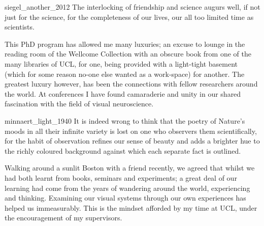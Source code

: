 \begin{acknowledgements}


\begin{citequote}{siegel_another_2012}
The interlocking of friendship and science augurs well, if not just for the science, for the completeness of our lives, our all too limited time as scientists.
\end{citequote}

This PhD program has allowed me many luxuries; an excuse to lounge in the reading room of the Wellcome Collection with an obscure book from one of the many libraries of \acrshort{UCL}, for one, being provided with a light-tight basement (which for some reason no-one else wanted as a work-space) for another.
The greatest luxury however, has been the connections with fellow researchers around the world. At conferences I have found camaraderie and unity in our shared fascination with the field of visual neuroscience. 
\bigskip

\begin{citequote}{minnaert_light_1940}
It is indeed wrong to think that the poetry of Nature's moods in all their infinite variety is lost on one who observers them scientifically, for the habit of observation refines our sense of beauty and adds a brighter hue to the richly coloured background against which each separate fact is outlined.
\end{citequote}

Walking around a sunlit Boston with a friend recently, we agreed that whilst we had both learnt from books, seminars and experiments; a great deal of our learning had come from the years of wandering around the world, experiencing and thinking. Examining our visual systems through our own experiences has helped us immeasurably. This is the mindset afforded by my time at \gls{UCL}, under the encouragement of my supervisors.


\end{acknowledgements}

